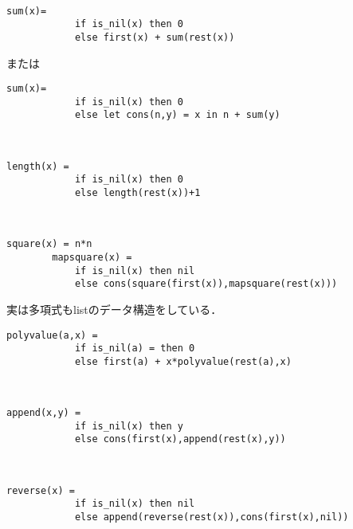 \documentclass[uplatex, 12pt, dvipdfmx]{jsreport}
\begin{document}
\begin{example}[和]　

    \begin{lstlisting}[caption=sum]
        sum(x)=
            if is_nil(x) then 0
            else first(x) + sum(rest(x))
    \end{lstlisting}
    または
    \begin{lstlisting}[caption=sum]
        sum(x)=
            if is_nil(x) then 0
            else let cons(n,y) = x in n + sum(y)
    \end{lstlisting}
\end{example}

\begin{example}[長さ]　

    \begin{lstlisting}[caption=length]
        length(x) =
            if is_nil(x) then 0
            else length(rest(x))+1
    \end{lstlisting}
\end{example}

\begin{example}　\label{example-pointwise-square}

    \begin{lstlisting}[caption=point-wise square]
        square(x) = n*n
        mapsquare(x) =
            if is_nil(x) then nil
            else cons(square(first(x)),mapsquare(rest(x)))
    \end{lstlisting}
\end{example}

\begin{example}
    実は多項式もlistのデータ構造をしている．
    \begin{lstlisting}[caption=Horner's polynomial]
        polyvalue(a,x) =
            if is_nil(a) = then 0
            else first(a) + x*polyvalue(rest(a),x)
    \end{lstlisting}
\end{example}

\begin{example}[append]　\label{example-append-on-Nlist}

    \begin{lstlisting}[caption=append]
        append(x,y) =
            if is_nil(x) then y
            else cons(first(x),append(rest(x),y))
    \end{lstlisting}
\end{example}

\begin{example}[reverse]　

    \begin{lstlisting}[caption=reverse]
        reverse(x) =
            if is_nil(x) then nil
            else append(reverse(rest(x)),cons(first(x),nil))
    \end{lstlisting}
\end{example}
\end{document}
